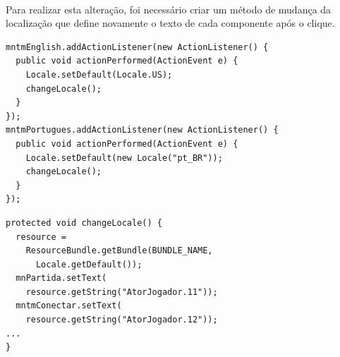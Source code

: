 \documentclass[a4paper, 12pt]{article}
\begin{document}
\FloatBarrier
\paragraph{} Para realizar esta alteração, foi necessário criar um
método de mudança da localização que define novamente o texto de cada
componente após o clique.

\begin{lstlisting}[frame=single, caption={Clique no Menu de Linguagem},
  captionpos=b]
mntmEnglish.addActionListener(new ActionListener() {
  public void actionPerformed(ActionEvent e) {
    Locale.setDefault(Locale.US);
    changeLocale();
  }
});
mntmPortugues.addActionListener(new ActionListener() {
  public void actionPerformed(ActionEvent e) {
    Locale.setDefault(new Locale("pt_BR"));
    changeLocale();
  }
});
\end{lstlisting}

\begin{lstlisting}[frame=single, caption={Método de definição das
    novas \emph{Strings}}, captionpos=b]
protected void changeLocale() {
  resource = 
    ResourceBundle.getBundle(BUNDLE_NAME,
      Locale.getDefault());
  mnPartida.setText(
    resource.getString("AtorJogador.11"));
  mntmConectar.setText(
    resource.getString("AtorJogador.12"));
...
}
\end{lstlisting}
\end{document}
